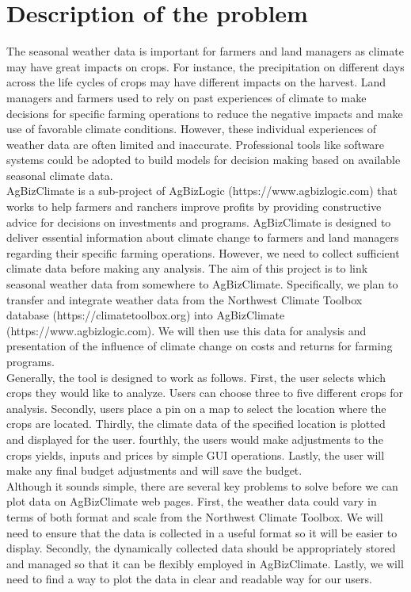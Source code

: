 \documentclass[letterpaper,10pt]{article}
\begin{document}
    \section*{Description of the problem}
    The seasonal weather data is important for farmers and land managers as climate may have great impacts on crops. For instance, the precipitation on different days across the life cycles of crops may have different impacts on the harvest. Land managers and farmers used to rely on past experiences of climate to make decisions for specific farming operations to reduce the negative impacts and make use of favorable climate conditions. However, these individual experiences of weather data are often limited and inaccurate. Professional tools like software systems could be adopted to build models for decision making based on available seasonal climate data.\\
    
    AgBizClimate is a sub-project of AgBizLogic (https://www.agbizlogic.com) that works to help farmers and ranchers improve profits by providing constructive advice for decisions on investments and programs. AgBizClimate is designed to deliver essential information about climate change to farmers and land managers regarding their specific farming operations. However, we need to collect sufficient climate data before making any analysis. The aim of this project is to link seasonal weather data from somewhere to AgBizClimate. Specifically, we plan to transfer and integrate weather data from the Northwest Climate Toolbox database (https://climatetoolbox.org) into AgBizClimate (https://www.agbizlogic.com). We will then use this data for analysis and presentation of the influence of climate change on costs and returns for farming programs.\\
    
    Generally, the tool is designed to work as follows. First, the user selects which crops they would like to analyze. Users can choose three to five different crops for analysis. Secondly, users place a pin on a map to select the location where the crops are located. Thirdly, the climate data of the specified location is plotted and displayed for the user. fourthly, the users would make adjustments to the crops yields, inputs and prices by simple GUI operations. Lastly, the user will make any final budget adjustments and will save the budget.\\
    
    Although it sounds simple, there are several key problems to solve before we can plot data on AgBizClimate web pages. First, the weather data could vary in terms of both format and scale from the Northwest Climate Toolbox. We will need to ensure that the data is collected in a useful format so it will be easier to display. Secondly, the dynamically collected data should be appropriately stored and managed so that it can be flexibly employed in AgBizClimate. Lastly, we will need to find a way to plot the data in clear and readable way for our users.
\end{document}

